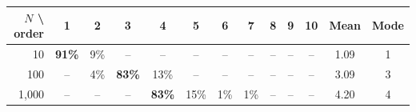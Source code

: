 \begin{tabular}{rcccccccccccc}
\toprule
$N$ \textbackslash{} order & 1 & 2 & 3 & 4 & 5 & 6 & 7 & 8 & 9 & 10 & Mean & Mode \\
\midrule
10 & \textbf{91\%} & 9\% & -- & -- & -- & -- & -- & -- & -- & -- & 1.09 & 1 \\
100 & -- & 4\% & \textbf{83\%} & 13\% & -- & -- & -- & -- & -- & -- & 3.09 & 3 \\
1,000 & -- & -- & -- & \textbf{83\%} & 15\% & 1\% & 1\% & -- & -- & -- & 4.20 & 4 \\
\bottomrule
\end{tabular}
